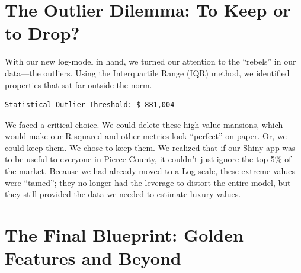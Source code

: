 \documentclass[
  english,
  letterpaper,
  DIV=11,
  numbers=noendperiod]{scrreprt}
\newenvironment{Shaded}{\begin{snugshade}}{\end{snugshade}}
\newcommand{\FloatTok}[1]{\textcolor[rgb]{0.68,0.00,0.00}{#1}}
\newcommand{\FunctionTok}[1]{\textcolor[rgb]{0.28,0.35,0.67}{#1}}
\newcommand{\NormalTok}[1]{\textcolor[rgb]{0.00,0.23,0.31}{#1}}
\newcommand{\OtherTok}[1]{\textcolor[rgb]{0.00,0.23,0.31}{#1}}
\newcommand{\SpecialCharTok}[1]{\textcolor[rgb]{0.37,0.37,0.37}{#1}}
\newcommand{\StringTok}[1]{\textcolor[rgb]{0.13,0.47,0.30}{#1}}
\begin{document}
\section{The Outlier Dilemma: To Keep or to
Drop?}\label{the-outlier-dilemma-to-keep-or-to-drop}

With our new log-model in hand, we turned our attention to the
``rebels'' in our data---the outliers. Using the Interquartile Range
(IQR) method, we identified properties that sat far outside the norm.

\begin{Shaded}
\end{Shaded}

\begin{verbatim}
Statistical Outlier Threshold: $ 881,004 
\end{verbatim}

We faced a critical choice. We could delete these high-value mansions,
which would make our R-squared and other metrics look ``perfect'' on
paper. Or, we could keep them. We chose to keep them. We realized that
if our Shiny app was to be useful to everyone in Pierce County, it
couldn't just ignore the top 5\% of the market. Because we had already
moved to a Log scale, these extreme values were ``tamed''; they no
longer had the leverage to distort the entire model, but they still
provided the data we needed to estimate luxury values.

\section{The Final Blueprint: Golden Features and
Beyond}\label{the-final-blueprint-golden-features-and-beyond}
\end{document}
